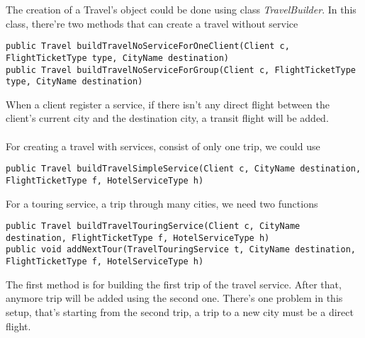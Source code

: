 The creation of a Travel's object could be done using class \textit{TravelBuilder}. In this class, there're two methods that can create a travel without service

\begin{lstlisting}
public Travel buildTravelNoServiceForOneClient(Client c, FlightTicketType type, CityName destination)
public Travel buildTravelNoServiceForGroup(Client c, FlightTicketType type, CityName destination)
\end{lstlisting}

When a client register a service, if there isn't any direct flight between the client's current city and the destination city, a transit flight will be added.  

\paragraph{}
For creating a travel with services, consist of only one trip, we could use

\begin{lstlisting}
public Travel buildTravelSimpleService(Client c, CityName destination, FlightTicketType f, HotelServiceType h)
\end{lstlisting}

For a touring service, a trip through many cities, we need two functions

\begin{lstlisting}
public Travel buildTravelTouringService(Client c, CityName destination, FlightTicketType f, HotelServiceType h)
public void addNextTour(TravelTouringService t, CityName destination, FlightTicketType f, HotelServiceType h)
\end{lstlisting}

The first method is for building the first trip of the travel service. After that, anymore trip will be added using the second one. There's one problem in this setup, that's starting from the second trip, a trip to a new city must be a direct flight.





